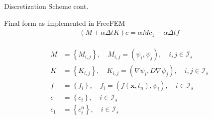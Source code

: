 \documentclass[11pt,t]{beamer}
\begin{document}
\begin{frame}[fragile]{Discretization Scheme cont.}


Final form as implemented in FreeFEM
\begin{gather*}
(M+\alpha \Delta t K) c=\alpha M c_{1}+\alpha \Delta t f
\end{gather*}


\begin{gather*}
\begin{aligned} M &=\left\{M_{i, j}\right\}, \quad M_{i, j}=\left(\psi_{i}, \psi_{j}\right), \quad i, j \in \mathcal{I}_{s} \\ K &=\left\{K_{i, j}\right\}, \quad K_{i, j}=\left(\nabla \psi_{i}, D \nabla \psi_{j}\right), \quad i, j \in \mathcal{I}_{s} \\ f &=\left\{f_{i}\right\}, \quad f_{i}=\left(f\left(\boldsymbol{x}, t_{n}\right), \psi_{i}\right), \quad i \in \mathcal{I}_{s} \\ c &=\left\{c_{i}\right\}, \quad i \in \mathcal{I}_{s} \\ c_{1} &=\left\{c_{i}^{n}\right\}, \quad i \in \mathcal{I}_{s} \end{aligned}
\end{gather*}

\end{frame}
\end{document}
